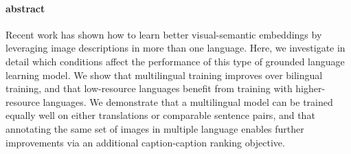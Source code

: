 


%

\paragraph{abstract}

Recent work has shown how to learn better visual-semantic embeddings by leveraging image descriptions in more than one language. Here, we investigate in detail which conditions affect the performance of this type of grounded language learning model. We show that multilingual training improves over bilingual training, and that low-resource languages benefit from training with higher-resource languages. We demonstrate that a multilingual model can be trained equally well on either translations or comparable sentence pairs, and that annotating the same set of images in multiple language enables further improvements via an additional caption-caption ranking objective.

